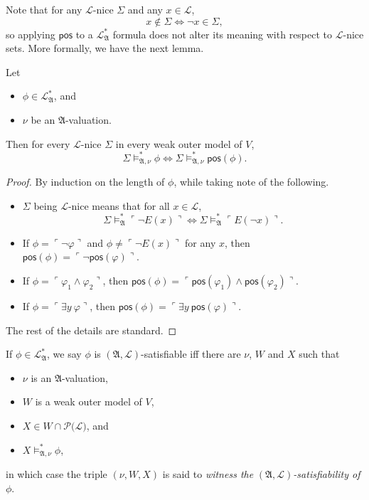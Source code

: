 \documentclass[12pt]{article}
\numberwithin{equation}{section}
\begin{document}
Note that for any $\mathcal{L}$-nice $\Sigma$ and any $x \in \mathcal{L}$, $$x \not\in \Sigma \iff \neg x \in \Sigma,$$ so applying $\mathsf{pos}$ to a $\mathcal{L}^{*}_{\mathfrak{A}}$ formula does not alter its meaning with respect to $\mathcal{L}$-nice sets. More formally, we have the next lemma.

\begin{lem}\label{corr}
Let 
\begin{itemize}
    \item $\phi \in \mathcal{L}^{*}_{\mathfrak{A}}$, and
    \item $\nu$ be an $\mathfrak{A}$-valuation.
\end{itemize}
Then for every $\mathcal{L}$-nice $\Sigma$ in every weak outer model of $V$, $$\Sigma \models^*_{\mathfrak{A}, \nu} \phi \iff \Sigma \models^*_{\mathfrak{A}, \nu} \mathsf{pos}(\phi).$$
\end{lem}

\begin{proof}
By induction on the length of $\phi$, while taking note of the following.
\begin{itemize}
    \item $\Sigma$ being $\mathcal{L}$-nice means that for all $x \in \mathcal{L}$, $$\Sigma \models^*_{\mathfrak{A}} \ulcorner \neg E(x) \urcorner \iff \Sigma \models^*_{\mathfrak{A}} \ulcorner E(\neg x) \urcorner.$$ 
    \item If $\phi = \ulcorner \neg \varphi \urcorner$ and $\phi \neq \ulcorner \neg E(x) \urcorner$ for any $x$, then $\mathsf{pos}(\phi) = \ulcorner \neg \mathsf{pos}(\varphi) \urcorner$.
    \item If $\phi = \ulcorner \varphi_1 \wedge \varphi_2 \urcorner$, then $\mathsf{pos}(\phi) = \ulcorner \mathsf{pos}(\varphi_1) \wedge \mathsf{pos}(\varphi_2) \urcorner$.
    \item If $\phi = \ulcorner \exists y \ \varphi \urcorner$, then $\mathsf{pos}(\phi) = \ulcorner \exists y \ \mathsf{pos}(\varphi) \urcorner$.
\end{itemize}
The rest of the details are standard.
\end{proof}

\begin{defi}
If $\phi \in \mathcal{L}^{*}_{\mathfrak{A}}$, we say $\phi$ is $(\mathfrak{A}, \mathcal{L})$-satisfiable iff there are $\nu$, $W$ and $X$ such that
\begin{itemize}
    \item $\nu$ is an $\mathfrak{A}$-valuation,
    \item $W$ is a weak outer model of $V$,
    \item $X \in W \cap \mathcal{P}(\mathcal{L)}$, and
    \item $X \models^*_{\mathfrak{A}, \nu} \phi$,
\end{itemize}
in which case the triple $(\nu, W, X)$ is said to \emph{witness the} $(\mathfrak{A}, \mathcal{L})$\emph{-satisfiability of} $\phi$.
\end{defi}
\end{document}
